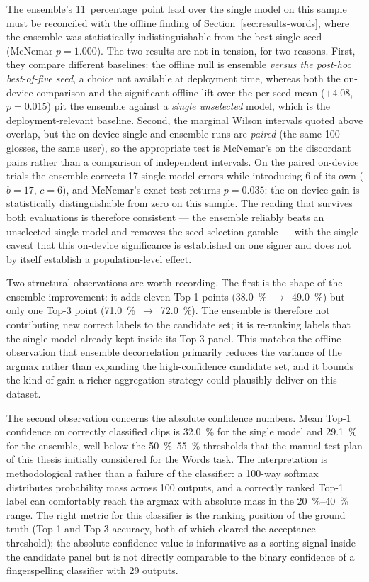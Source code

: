 The ensemble's \SI{11}{percentage point} lead over the single model on
this sample must be reconciled with the offline finding of
Section~\ref{sec:results-words}, where the ensemble was statistically
indistinguishable from the best single seed (McNemar
\(p = 1.000\)). The two results are not in tension, for two reasons.
First, they compare different baselines: the offline null is ensemble
\emph{versus the post-hoc best-of-five seed}, a choice not available
at deployment time, whereas both the on-device comparison and the
significant offline lift over the per-seed mean (\(+4.08\),
\(p = 0.015\)) pit the ensemble against a \emph{single unselected}
model, which is the deployment-relevant baseline. Second, the
marginal Wilson intervals quoted above overlap, but the on-device
single and ensemble runs are \emph{paired} (the same 100 glosses, the
same user), so the appropriate test is McNemar's on the discordant
pairs rather than a comparison of independent intervals. On the
paired on-device trials the ensemble corrects 17 single-model errors
while introducing 6 of its own (\(b = 17\), \(c = 6\)), and
McNemar's exact test returns \(p = 0.035\): the on-device gain is
statistically distinguishable from zero on this sample. The reading
that survives both evaluations is therefore consistent --- the
ensemble reliably beats an unselected single model and removes the
seed-selection gamble --- with the single caveat that this on-device
significance is established on one signer and does not by itself
establish a population-level effect.

Two structural observations are worth recording. The first is the
shape of the ensemble improvement: it adds eleven Top-1 points
(\SI{38.0}{\percent}~$\rightarrow$~\SI{49.0}{\percent}) but only one
Top-3 point (\SI{71.0}{\percent}~$\rightarrow$~\SI{72.0}{\percent}).
The ensemble is therefore not contributing new correct labels to the
candidate set; it is re-ranking labels that the single model
already kept inside its Top-3 panel. This matches the offline
observation that ensemble decorrelation primarily reduces the
variance of the argmax rather than expanding the high-confidence
candidate set, and it bounds the kind of gain a richer aggregation
strategy could plausibly deliver on this dataset.

The second observation concerns the absolute confidence numbers.
Mean Top-1 confidence on correctly classified clips is
\SI{32.0}{\percent} for the single model and \SI{29.1}{\percent} for
the ensemble, well below the \SI{50}{\percent}--\SI{55}{\percent}
thresholds that the manual-test plan of this thesis initially
considered for the Words task. The interpretation is methodological rather than a
failure of the classifier: a 100-way softmax distributes
probability mass across 100 outputs, and a correctly ranked Top-1
label can comfortably reach the argmax with absolute mass in the
\SIrange{20}{40}{\percent} range. The right metric for this
classifier is the ranking position of the ground truth (Top-1 and
Top-3 accuracy, both of which cleared the acceptance threshold);
the absolute confidence value is informative as a sorting signal
inside the candidate panel but is not directly comparable to the
binary confidence of a fingerspelling classifier with 29 outputs.

